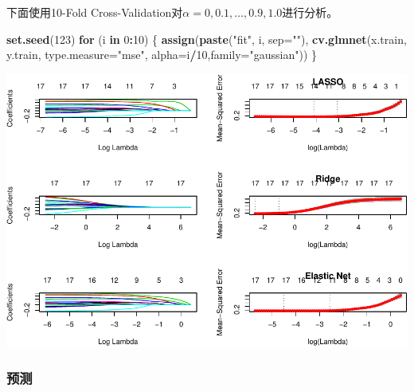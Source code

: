\documentclass[]{article}
\newenvironment{Shaded}{\begin{snugshade}}{\end{snugshade}}
\newcommand{\KeywordTok}[1]{\textcolor[rgb]{0.13,0.29,0.53}{\textbf{#1}}}
\newcommand{\DataTypeTok}[1]{\textcolor[rgb]{0.13,0.29,0.53}{#1}}
\newcommand{\DecValTok}[1]{\textcolor[rgb]{0.00,0.00,0.81}{#1}}
\newcommand{\StringTok}[1]{\textcolor[rgb]{0.31,0.60,0.02}{#1}}
\newcommand{\ControlFlowTok}[1]{\textcolor[rgb]{0.13,0.29,0.53}{\textbf{#1}}}
\newcommand{\OperatorTok}[1]{\textcolor[rgb]{0.81,0.36,0.00}{\textbf{#1}}}
\newcommand{\NormalTok}[1]{#1}
\begin{document}
下面使用10-Fold
Cross-Validation对\(\alpha = 0, 0.1, \dots, 0.9, 1.0\)进行分析。

\begin{Shaded}
\begin{Highlighting}[]
\KeywordTok{set.seed}\NormalTok{(}\DecValTok{123}\NormalTok{)}
\ControlFlowTok{for}\NormalTok{ (i }\ControlFlowTok{in} \DecValTok{0}\OperatorTok{:}\DecValTok{10}\NormalTok{) \{}
  \KeywordTok{assign}\NormalTok{(}\KeywordTok{paste}\NormalTok{(}\StringTok{"fit"}\NormalTok{, i, }\DataTypeTok{sep=}\StringTok{""}\NormalTok{), }\KeywordTok{cv.glmnet}\NormalTok{(x.train, y.train, }
         \DataTypeTok{type.measure=}\StringTok{"mse"}\NormalTok{,  }\DataTypeTok{alpha=}\NormalTok{i}\OperatorTok{/}\DecValTok{10}\NormalTok{,}\DataTypeTok{family=}\StringTok{"gaussian"}\NormalTok{))}
\NormalTok{\}}
\end{Highlighting}
\end{Shaded}

\includegraphics{FinalProjectForRegressionAnalysis_files/figure-latex/unnamed-chunk-43-1.pdf}

\subsubsection{预测}\label{-1}
\end{document}
